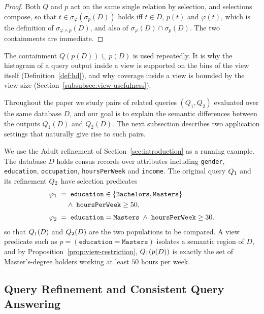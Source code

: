 \begin{proof}
Both $Q$ and $p$ act on the same single relation by selection, and selections
compose, so that $t\in\sigma_\varphi(\sigma_p(D))$ holds iff $t\in D$, $p(t)$ and $\varphi(t)$,
which is the definition of $\sigma_{\varphi\wedge p}(D)$, and also of
$\sigma_\varphi(D)\cap\sigma_p(D)$.
The two containments are immediate.
\end{proof}

The containment $Q(p(D))\subseteq p(D)$ is used repeatedly.
It is why the histogram
of a query output inside a view is supported on the bins of the view itself
(Definition~\ref{def:hd}), and why coverage inside a view is bounded by the view
size (Section~\ref{subsubsec:view-usefulness}).

Throughout the paper we study pairs of related queries $(Q_1,Q_2)$ evaluated over
the same database $D$, and our goal is to explain the semantic differences between
the outputs $Q_1(D)$ and $Q_2(D)$.
The next subsection describes two application settings that naturally give rise to
such pairs.

\begin{example}
\label{ex:running}
We use the Adult refinement of Section~\ref{sec:introduction} as a running example.
The database $D$ holds census records over attributes including
\texttt{gender}, \texttt{education}, \texttt{occupation}, \texttt{hoursPerWeek} and
\texttt{income}.
The original query $Q_1$ and its refinement $Q_2$ have selection
predicates
\begin{align*}
\varphi_1 &\;=\; \texttt{education} \in \{\texttt{Bachelors},\texttt{Masters}\}\\
          &\hphantom{\;=\;} \wedge\; \texttt{hoursPerWeek} \ge 50 ,\\[3pt]
\varphi_2 &\;=\; \texttt{education} = \texttt{Masters}
              \;\wedge\; \texttt{hoursPerWeek} \ge 30 .
\end{align*}
so that $Q_1(D)$ and $Q_2(D)$ are the two populations to be compared.
A view predicate such as $p = (\texttt{education}=\texttt{Masters})$ isolates a
semantic region of $D$, and by Proposition~\ref{prop:view-restriction},
$Q_1(p(D))$ is exactly the set of Master's-degree holders working at least
$50$ hours per week.
\end{example}

\subsection{Query Refinement and Consistent Query Answering}
\label{subsec:prelim-settings}


